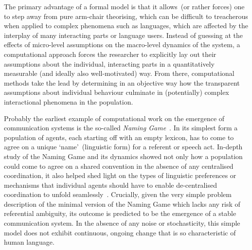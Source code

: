 The primary advantage of a formal model is that it allows~(or rather forces) one to step away from pure arm-chair theorising, which can be difficult to treacherous when applied to complex phenomena such as languages, which are affected by the interplay of many interacting parts or language users. Instead of guessing at the effects of micro-level assumptions on the macro-level dynamics of the system, a computational approach forces the researcher to explicitly lay out their assumptions about the individual, interacting parts in a quantitatively measurable (and ideally also well-motivated) way. From there, computational methods take the lead by determining in an objective way how the transparent assumptions about individual behaviour culminate in (potentially) complex interactional phenomena in the population.

Probably the earliest example of computational work on the emergence of communication systems is the so-called \emph{Naming Game}~\citep{Steels1995,Steels1998naminggame,Baronchelli2006}.
In its simplest form a population of agents, each starting off with an empty lexicon, has to come to agree on a unique `name'~(linguistic form) for a referent or speech act. In-depth study of the Naming Game and its dynamics showed not only how a population could come to agree on a shared convention in the absence of any centralised coordination, it also helped shed light on the types of linguistic preferences or mechanisms that individual agents should have to enable de-centralised coordination to unfold seamlessly~\citep{Wellens2012,Spike2016}. 
Crucially, given the very simple problem description of the minimal version of the Naming Game which lacks any risk of referential ambiguity, its outcome is predicted \citep[and in some cases even proven][]{DeVylder2006,Skyrms2010} to be the emergence of a stable communication system. In the absence of any noise or stochasticity, this simple model does not exhibit continuous, ongoing change that is so characteristic of human language. %



